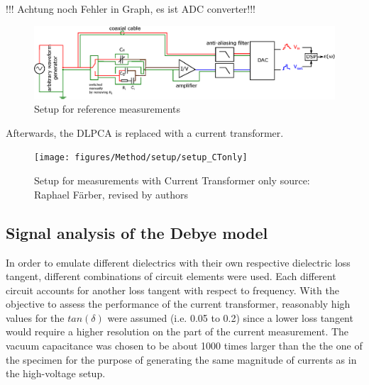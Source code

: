 !!! Achtung noch Fehler in Graph, es ist ADC converter!!!
\begin{figure}[htbp]
	\centering
	\includegraphics[width=\textwidth]{figures/Method/setup/setup_DLPCA.eps}		
	\caption[Kurze Abbildungsbeschreibung]{Setup for reference measurements \protect\footnotemark} 
	
	\label{sec.setup_amplifier}

\end{figure}


Afterwards, the DLPCA is replaced with a current transformer. 
\begin{figure}[htbp]
	\centering
	\texttt{[image: figures/Method/setup/setup\_CTonly]}		
	\caption[Kurze Abbildungsbeschreibung]{Setup for measurements with Current Transformer only {source: Raphael F\"arber, revised by authors}} 
	\label{sec.setup}

\end{figure}


\subsection{Signal analysis of the Debye model}

In order to emulate different dielectrics with their own respective dielectric loss tangent, different combinations of circuit elements were used.
Each different circuit accounts for another loss tangent with respect to frequency. With the objective to assess the performance of the current transformer, reasonably high values for the $tan\left(\delta\right)$ were assumed (i.e. 0.05 to 0.2) since a lower loss tangent
would require a higher resolution on the part of the current measurement. The vacuum capacitance was chosen to be about 1000 times larger than
the the one of the specimen for the purpose of generating the same magnitude of currents as in the high-voltage setup.



